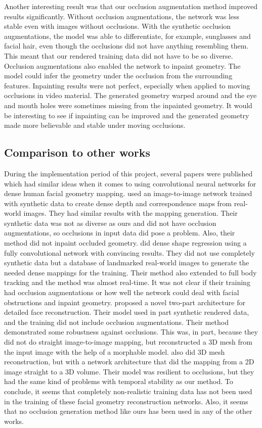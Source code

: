 Another interesting result was that our occlusion augmentation method improved results significantly. Without occlusion augmentations, the network was less stable even with images without occlusions. With the synthetic occlusion augmentations, the model was able to differentiate, for example, sunglasses and facial hair, even though the occlusions did not have anything resembling them. This meant that our rendered training data did not have to be so diverse. Occlusion augmentations also enabled the network to inpaint geometry. The model could infer the geometry under the occlusion from the surrounding features. Inpainting results were not perfect, especially when applied to moving occlusions in video material. The generated geometry warped around and the eye and mouth holes were sometimes missing from the inpainted geometry. It would be interesting to see if inpainting can be improved and the generated geometry made more believable and stable under moving occlusions.

\subsection{Comparison to other works}

During the implementation period of this project, several papers were published which had similar ideas when it comes to using convolutional neural networks for dense human facial geometry mapping. \textcite{Sela2017} used an image-to-image network trained with synthetic data to create dense depth and correspondence maps from real-world images. They had similar results with the mapping generation. Their synthetic data was not as diverse as ours and did not have occlusion augmentations, so occlusions in input data did pose a problem. Also, their method did not inpaint occluded geometry. \textcite{Guler2016} did dense shape regression using a fully convolutional network with convincing results. They did not use completely synthetic data but a database of landmarked real-world images to generate the needed dense mappings for the training. Their method also extended to full body tracking and the method was almost real-time. It was not clear if their training had occlusion augmentations or how well the network could deal with facial obstructions and inpaint geometry. \textcite{Richardson2016} proposed a novel two-part architecture for detailed face reconstruction. Their model used in part synthetic rendered data, and the training did not include occlusion augmentations. Their method demonstrated some robustness against occlusions. This was, in part, because they did not do straight image-to-image mapping, but reconstructed a 3D mesh from the input image with the help of a morphable model. \textcite{Jackson2017} also did 3D mesh reconstruction, but with a network architecture that did the mapping from a 2D image straight to a 3D volume. Their model was resilient to occlusions, but they had the same kind of problems with temporal stability as our method. To conclude, it seems that completely non-realistic training data has not been used in the training of these facial geometry reconstruction networks. Also, it seems that no occlusion generation method like ours has been used in any of the other works.

